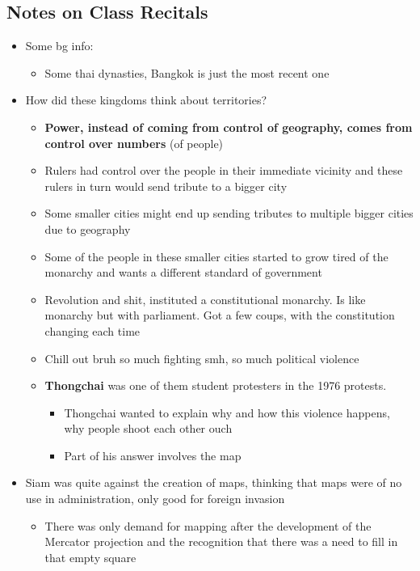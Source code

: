 \documentclass[a4paper]{article}
\begin{document}
\subsection{Notes on Class Recitals}
\begin{itemize}
	\item Some bg info:
	\begin{itemize}[label=$\circ$]
		\item Some thai dynasties, Bangkok is just the most recent one
	\end{itemize}
	\item How did these kingdoms think about territories?
	\begin{itemize}[label=$\circ$]
		\item \textbf{Power, instead of coming from control of geography, comes from control over numbers} (of people)
		\item Rulers had control over the people in their immediate vicinity and these rulers in turn would send tribute to a bigger city
		\item Some smaller cities might end up sending tributes to multiple bigger cities due to geography 
		\item Some of the people in these smaller cities started to grow tired of the monarchy and wants a different standard of government
		\item Revolution and shit, instituted a constitutional monarchy. Is like monarchy but with parliament. Got a few coups, with the constitution changing each time
		\item Chill out bruh so much fighting smh, so much political violence
		\item \textbf{Thongchai} was one of them student protesters in the 1976 protests. 
		\begin{itemize}[label=\tiny$\blacksquare$]
			\item Thongchai wanted to explain why and how this violence happens, why people shoot each other ouch
			\item Part of his answer involves the map
		\end{itemize}
	\end{itemize}
	\item Siam was quite against the creation of maps, thinking that maps were of no use in administration, only good for foreign invasion
	\begin{itemize}[label=$\circ$]
		\item There was only demand for mapping after the development of the Mercator projection and the recognition that there was a need to fill in that empty square

\end{itemize}
\end{itemize}
\end{document}
